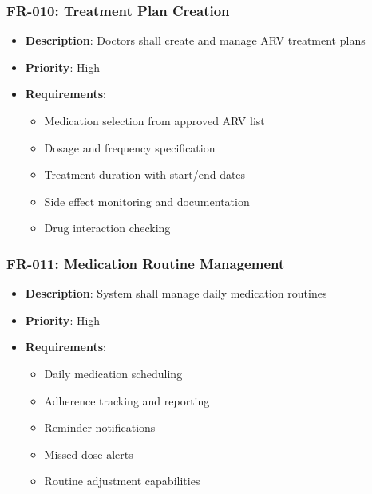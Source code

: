 \documentclass[12pt,a4paper]{article}
\begin{document}
\subsubsection{FR-010: Treatment Plan Creation}
\begin{itemize}
    \item \textbf{Description}: Doctors shall create and manage ARV treatment plans
    \item \textbf{Priority}: High
    \item \textbf{Requirements}:
    \begin{itemize}
        \item Medication selection from approved ARV list
        \item Dosage and frequency specification
        \item Treatment duration with start/end dates
        \item Side effect monitoring and documentation
        \item Drug interaction checking
    \end{itemize}
\end{itemize}

\subsubsection{FR-011: Medication Routine Management}
\begin{itemize}
    \item \textbf{Description}: System shall manage daily medication routines
    \item \textbf{Priority}: High
    \item \textbf{Requirements}:
    \begin{itemize}
        \item Daily medication scheduling
        \item Adherence tracking and reporting
        \item Reminder notifications
        \item Missed dose alerts
        \item Routine adjustment capabilities
    \end{itemize}
\end{itemize}
\end{document}
